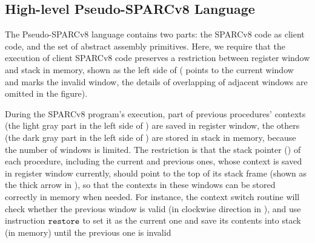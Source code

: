 \subsection{High-level Pseudo-SPARCv8 Language}
\label{subsec:High-level Pseudo-SPARCv8 Language}

The Pseudo-SPARCv8 language contains two parts: 
the SPARCv8 code as client code, 
and the set of abstract assembly primitives. 
Here, we require that the execution of client SPARCv8 code 
preserves a restriction between register 
window and stack in memory, shown
as the left side of 
\Fig{\ref{fig:Abstraction of Register Windows and Memory}}
(\regcwp{} points to the current window and \regwim{} marks 
the invalid window, the details of overlapping 
of adjacent windows are omitted in the figure).
\begin{center}
    
    \vspace*{-0.5em}
    \label{fig:Abstraction of Register Windows and Memory}
    \vspace{-0.5em}
\end{center}
During the SPARCv8 program's execution, 
part of previous procedures' contexts 
(the light gray part in the left side of
\Fig{\ref{fig:Abstraction of Register Windows and Memory}}) 
are saved in register window, the others 
(the dark gray part in the left side of 
\Fig{\ref{fig:Abstraction of Register Windows and Memory}})
are stored in stack in memory, 
because the number of windows is limited. 
The restriction is that the stack pointer 
(\spreg{}) of each procedure, 
including the current and previous ones, 
whose context is saved in register 
window currently, should point to the top of its stack frame 
(shown as the thick arrow in 
\Fig{\ref{fig:Abstraction of Register Windows and Memory}}),
so that the contexts 
in these windows can be stored correctly 
in memory when needed. For instance,  
the context switch routine will check 
whether the previous window is valid 
(in clockwise direction in 
\Fig{\ref{fig:Abstraction of Register Windows and Memory}}), 
and use instruction $\texttt{restore}{}$ to set it as the 
current one and save its contents into stack 
(in memory) until the previous one is invalid 
